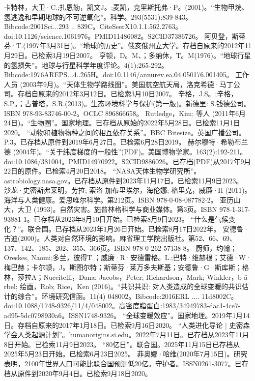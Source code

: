 \begin{enumerate}
 卡特林，大卫·C.;扎恩勒，凯文J。;麦凯，克里斯托弗·P。(2001)。“生物甲烷、氢逃逸和早期地球的不可逆氧化”。科学。293(5531):839-843。Bibcode:2001Sci...293 .. 839C。CiteSeerX10.1.1.562.2763。doi:10.1126/science.1061976。PMID11486082。S2CID37386726。   
 阿贝登，斯蒂芬·T.(1997年3月31日)。“地球的历史”。俄亥俄州立大学。存档自原来的2012年11月29日。已检索3月19日2007。
 亨顿，D。M、；多纳休，T。M(1976)。“地球行星的氢损失”。地球与行星科学年度评论。4(1):265-292。Bibcode:1976AREPS...4..265H。doi:10.1146/annurev.ea.04.050176.001405。
 工作人员 (2003年9月)。“天体生物学路线图”。美国航空航天局，洛克希德·马丁公司。存档自原来的2012年3月12日。已检索3月10日2007。
 辛格，J.S。;辛格，S.P。；古普塔，S.R.(2013)。生态环境科学与保护(第一版)。新德里: S.钱德公司。ISBN 978-93-83746-00-2。OCLC 896866658。
 Rutledge，Kim; 等人 (2011年6月24日)。“生物圈”。国家地理。已存档从原始的2022年5月28日。已检索11月1日2020。
 “动物和植物物种之间的相互依存关系”。BBC Bitesize。英国广播公司。P.3。已存档从原件到2019年6月27日。已检索6月28日2019。
 赫尔穆特·希勒布兰德 (2004年)。“关于纬度梯度的一般性”(PDF)。美国博物学家。163(2):192-211。doi:10.1086/381004。PMID14970922。S2CID9886026。已存档(PDF)从2017年9月22日的原件。已检索4月20日2018。   
 “NASA天体生物学研究所”。astrobiology.nasa.gov。已存档从原件到2023年11月17日。已检索11月9日2023。
 沙龙·史密斯弗莱明，劳拉; 索洛-加布里埃尔，海伦娜; 格里克，威廉·H (2011)。海洋与人类健康。爱思唯尔科学。第212页。ISBN 978-0-08-087782-2。
 亚历山大，大卫 (1993)。自然灾害。施普林格科学与商业媒体。第3页。ISBN 978-1-317-93881-1。已存档从2023年8月10日开始。已检索8月9日2023。
 “什么是气候变化？”。联合国。已存档从2023年1月26日开始。已检索8月17日2022年。
 安德鲁·古迪(2000)。人类对自然环境的影响。麻省理工学院出版社。第52、66、69、137、142、185、202、355、366页。ISBN 978-0-262-57138-8。
 厨师，约翰；Oreskes, Naomi;多兰，彼得T.；威廉·R·安德雷格。L.;巴特·维赫根；艾德·W·梅巴赫；卡尔顿，J。斯图尔特；斯蒂芬·莱万多夫斯基；安德鲁·G·斯库斯；格林，莎拉A；Nuccitelli，Dana; Jacobs，Peter; Richardson，Mark; Winkler，b ä rbel; 绘画，Rob; Rice，Ken (2016)。“共识共识: 对人类造成的全球变暖的共识估计的综合”。环境研究信函。11(4) 048002。Bibcode:2016ERL .... 11d8002C。doi:10.1088/1748-9326/11/4/048002。高密度脂蛋白:1983/34949783-dac1-4ce7-ad95-5dc0798930a6。ISSN1748-9326。 
 “全球变暖效应”。国家地理。2019年1月14日。存档自原来的2017年1月18日。已检索9月16日2020。
 “人类进化导论 | 史密森学会人类起源计划”。humanorigins.si.edu。2022年7月11日。已存档从2023年11月8日开始。已检索11月9日2023。
 “80亿日”。联合国。2025年11月15日已存档从2025年5月23日开始。已检索6月23日2025。
 菲奥娜·哈维(2020年7月15日)。研究表明，2100年世界人口可能比联合国预测低20亿。守护者。ISSN0261-3077。已存档从原件到2020年9月4日。已检索9月18日2020。 

\end{enumerate}
